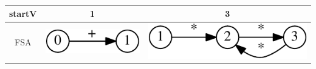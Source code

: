 \documentclass[10pt, conference, compsocconf]{IEEEtran}
\begin{document}
\begin{table}[t]
  \centering
  \begin{tabular}{| c | c | c | }
    \hline
    startV & 1 & 3  \\ \hline
    FSA 
    &
    \begin{minipage}{.15\textwidth}
    \vspace{1 mm} 
      \includegraphics[width=\linewidth]{pics/0_tok}
    \end{minipage}
    &
    \begin{minipage}{.15\textwidth}
    \vspace{1 mm} 
      \includegraphics[width=\linewidth]{pics/24_inv}
    \end{minipage}
    \\ \hline
   \end{tabular}
  

\end{table}
\end{document}
